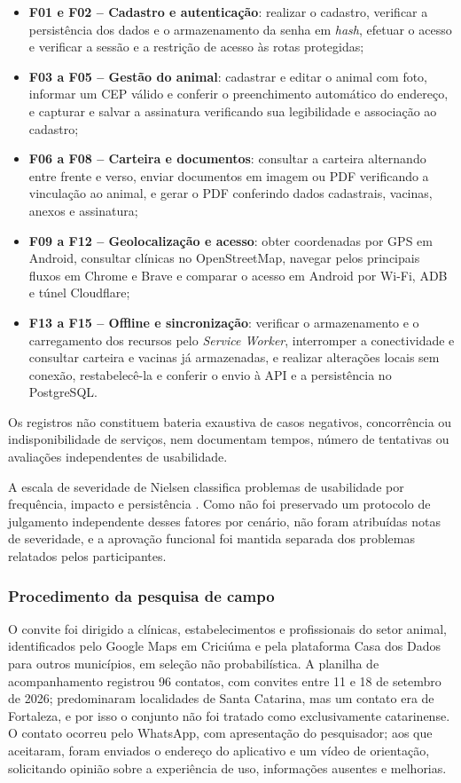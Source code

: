 \documentclass{UNESC}
\begin{document}
\begin{itemize}
    \item \textbf{F01 e F02 -- Cadastro e autenticação}: realizar o cadastro, verificar a persistência dos dados e o armazenamento da senha em \textit{hash}, efetuar o acesso e verificar a sessão e a restrição de acesso às rotas protegidas;
    \item \textbf{F03 a F05 -- Gestão do animal}: cadastrar e editar o animal com foto, informar um CEP válido e conferir o preenchimento automático do endereço, e capturar e salvar a assinatura verificando sua legibilidade e associação ao cadastro;
    \item \textbf{F06 a F08 -- Carteira e documentos}: consultar a carteira alternando entre frente e verso, enviar documentos em imagem ou PDF verificando a vinculação ao animal, e gerar o PDF conferindo dados cadastrais, vacinas, anexos e assinatura;
    \item \textbf{F09 a F12 -- Geolocalização e acesso}: obter coordenadas por GPS em Android, consultar clínicas no OpenStreetMap, navegar pelos principais fluxos em Chrome e Brave e comparar o acesso em Android por Wi-Fi, ADB e túnel Cloudflare;
    \item \textbf{F13 a F15 -- Offline e sincronização}: verificar o armazenamento e o carregamento dos recursos pelo \textit{Service Worker}, interromper a conectividade e consultar carteira e vacinas já armazenadas, e realizar alterações locais sem conexão, restabelecê-la e conferir o envio à API e a persistência no PostgreSQL.
\end{itemize} Os registros não constituem bateria exaustiva de casos negativos, concorrência ou indisponibilidade de serviços, nem documentam tempos, número de tentativas ou avaliações independentes de usabilidade.

A escala de severidade de Nielsen classifica problemas de usabilidade por frequência, impacto e persistência \cite{nielsen1994}. Como não foi preservado um protocolo de julgamento independente desses fatores por cenário, não foram atribuídas notas de severidade, e a aprovação funcional foi mantida separada dos problemas relatados pelos participantes.

\subsubsection{Procedimento da pesquisa de campo}

O convite foi dirigido a clínicas, estabelecimentos e profissionais do setor animal, identificados pelo Google Maps em Criciúma e pela plataforma Casa dos Dados para outros municípios, em seleção não probabilística. A planilha de acompanhamento registrou 96 contatos, com convites entre 11 e 18 de setembro de 2026; predominaram localidades de Santa Catarina, mas um contato era de Fortaleza, e por isso o conjunto não foi tratado como exclusivamente catarinense. O contato ocorreu pelo WhatsApp, com apresentação do pesquisador; aos que aceitaram, foram enviados o endereço do aplicativo e um vídeo de orientação, solicitando opinião sobre a experiência de uso, informações ausentes e melhorias.
\end{document}
